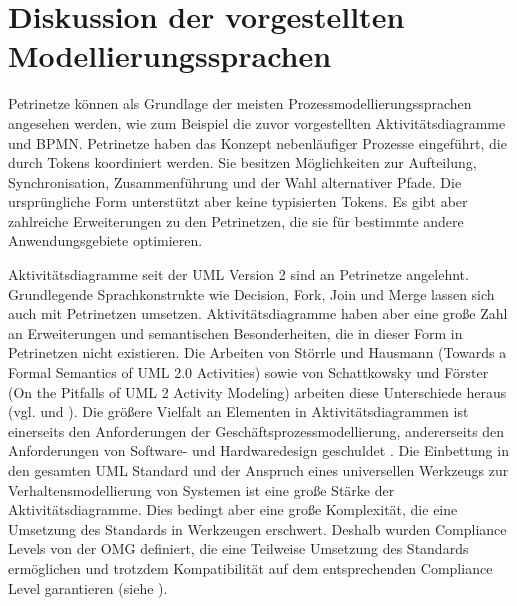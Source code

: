 \section{Diskussion der vorgestellten Modellierungssprachen}\label{mod-sum}

Petrinetze können als Grundlage der meisten Prozessmodellierungssprachen angesehen werden, wie zum Beispiel die zuvor vorgestellten Aktivitätsdiagramme und BPMN. Petrinetze haben das Konzept nebenläufiger Prozesse eingeführt, die durch Tokens koordiniert werden. Sie besitzen Möglichkeiten zur Aufteilung, Synchronisation, Zusammenführung und der Wahl alternativer Pfade. Die ursprüngliche Form unterstützt aber keine typisierten Tokens. Es gibt aber zahlreiche Erweiterungen zu den Petrinetzen, die sie für bestimmte andere Anwendungsgebiete optimieren.

Aktivitätsdiagramme seit der UML Version 2 sind an Petrinetze angelehnt. Grundlegende Sprachkonstrukte wie Decision, Fork, Join und Merge lassen sich auch mit Petrinetzen umsetzen. Aktivitätsdiagramme haben aber eine große Zahl an Erweiterungen und semantischen Besonderheiten, die in dieser Form in Petrinetzen nicht existieren. Die Arbeiten von Störrle und Hausmann (Towards a Formal Semantics of UML 2.0 Activities) sowie von Schattkowsky und Förster (On the Pitfalls of UML 2 Activity Modeling) arbeiten diese Unterschiede heraus (vgl. \citep{StorrleH2005} und \citep{SForster2007}). Die größere Vielfalt an Elementen in Aktivitätsdiagrammen ist einerseits den Anforderungen der Geschäftsprozessmodellierung, andererseits den Anforderungen von Software- und Hardwaredesign geschuldet \citep{SForster2007}. Die Einbettung in den gesamten UML Standard und der Anspruch eines universellen Werkzeugs zur Verhaltensmodellierung von Systemen ist eine große Stärke der Aktivitätsdiagramme. Dies bedingt aber eine große Komplexität, die eine Umsetzung des Standards in Werkzeugen erschwert. Deshalb wurden Compliance Levels von der OMG definiert, die eine Teilweise Umsetzung des Standards ermöglichen und trotzdem Kompatibilität auf dem entsprechenden Compliance Level garantieren (siehe ).

